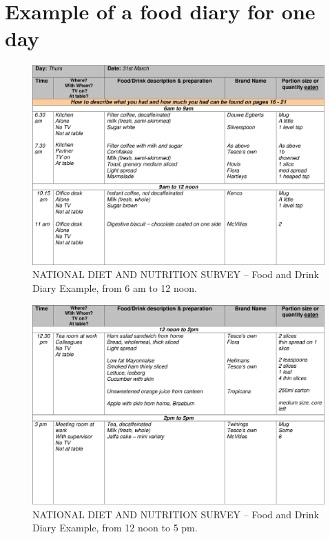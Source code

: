 
\chapter{Example of a food diary for one day} %


\label{AppendixE} %

\begin{figure}[H]
\centering
\includegraphics{Figures/Diary1.png}
\decoRule
\caption[One day food diary example 6 am to 12 noon.]{NATIONAL DIET AND NUTRITION SURVEY -- Food and Drink Diary Example, from 6 am to 12 noon.}
\label{fig:diary1}
\end{figure}

\begin{figure}
\centering
\includegraphics{Figures/Diary2.png}
\decoRule
\caption[One day food diary example 12 noon to 5 pm]{NATIONAL DIET AND NUTRITION SURVEY -- Food and Drink Diary Example, from 12 noon to 5 pm.}
\label{fig:diary2}
\end{figure}

